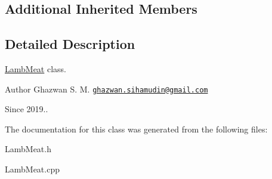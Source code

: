 \subsection*{Additional Inherited Members}


\subsection{Detailed Description}
\hyperlink{classLambMeat}{Lamb\+Meat} class.

\begin{DoxyAuthor}{Author}
Ghazwan S. M. \href{mailto:ghazwan.sihamudin@gmail.com}{\tt ghazwan.\+sihamudin@gmail.\+com} 
\end{DoxyAuthor}
\begin{DoxySince}{Since}
2019.. 
\end{DoxySince}


The documentation for this class was generated from the following files\+:\begin{DoxyCompactItemize}
\item 
Lamb\+Meat.\+h\item 
Lamb\+Meat.\+cpp\end{DoxyCompactItemize}
